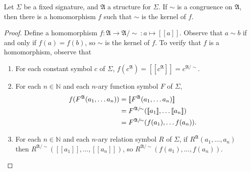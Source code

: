 \documentclass[12pt]{article}
\newcommand{\eqclass}[1]{[\![#1]\!]}
\newcommand{\A}{\mathfrak{A}}
\newcommand{\NN}{\mathbb{N}}
\begin{document}
Let $\Sigma$ be a fixed signature, and $\A$ a structure for $\Sigma$. If $\sim$ is a congruence on $\A$, then there is a homomorphism $f$ such that $\sim$ is the kernel of $f$.
\begin{proof}
Define a homomorphism $f\colon \A \to \A/\!\sim\ : a \mapsto \eqclass{a}$. Observe that \(a \sim b\) if and only if \(f(a) = f(b)\), so $\sim$ is the kernel of $f$. To verify that $f$ is a homomorphism, observe that 
\begin{enumerate}
  \item For each constant symbol $c$ of $\Sigma$, \(f(c^\A) = \eqclass{c^\A} = c^{\A/\!\sim}\).
  \item For each $n \in \NN$ and each $n$-ary function symbol $F$ of $\Sigma$,
	  	\begin{align*}
		 f(F^\A(a_1, \ldots a_n)) &= \eqclass{F^\A(a_1, \ldots a_n)} \\
		 &= F^{\A/\!\sim}(\eqclass{a_1}, \ldots \eqclass{a_n}) \\
		 &= F^{\A/\!\sim}(f(a_1), \ldots f(a_n)). \qedhere
		 \end{align*}
  \item For each $n \in \NN$ and each $n$-ary relation symbol $R$ of $\Sigma$, 
  		if \(R^\A(a_1, \ldots, a_n)\) then \(R^{\A/\!\sim}(\eqclass{a_1}, \ldots, \eqclass{a_n})\), so 
		\(R^{\A/\!\sim}(f(a_1), \ldots, f(a_n))\).		
\end{enumerate}
\end{proof}
\end{document}
